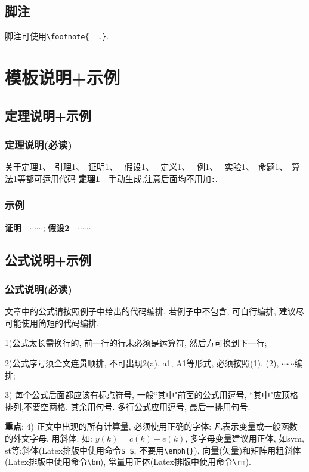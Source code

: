 \documentclass{setp-new}
\begin{document}
\subsection{脚注}

 脚注可使用\verb|\footnote{  .}|.

\section{模板说明+示例}

\subsection{定理说明+示例}

\subsubsection{定理说明(必读)}
关于定理1、~引理1、~证明1、~ 假设1、~ 定义1、~ 例1、~ 实验1、~命题1、~算法1等都可运用代码 \textbf{定理1}\ \ 手动生成,注意后面均不用加\verb|:|.

\subsubsection{示例}%

\textbf{证明}\ \ $\cdots\cdots$;
\textbf{假设2}\ \  $\cdots\cdots$

\subsection{公式说明+示例}

\subsubsection{公式说明(必读)}

文章中的公式请按照例子中给出的代码编排, 若例子中不包含, 可自行编排, 建议尽可能使用简短的代码编排.


1)公式太长需换行的, 前一行的行末必须是运算符, 然后方可换到下一行;

2)公式序号须全文连贯顺排, 不可出现2(a), a1, A1等形式, 必须按照(1),  (2), $\cdots$$\cdots$编排;

3) 每个公式后面都应该有标点符号, 一般``其中"前面的公式用逗号, ``其中"应顶格排列,不要空两格.  其余用句号. 多行公式应用逗号, 最后一排用句号.

{\bf 重点}: 4) 正文中出现的所有计算量, 必须使用正确的字体: 凡表示变量或一般函数的外文字母, 用斜体. 如: $y(k)=c(k)+e(k)$, 多字母变量建议用正体, 如sym, st等;斜体(Latex排版中使用命令\verb|$ $|, 不要用\verb|\emph{}|), 向量(矢量)和矩阵用粗斜体(Latex排版中使用命令\verb|\bm|), 常量用正体(Latex排版中使用命令\verb|\rm|).
\end{document}
